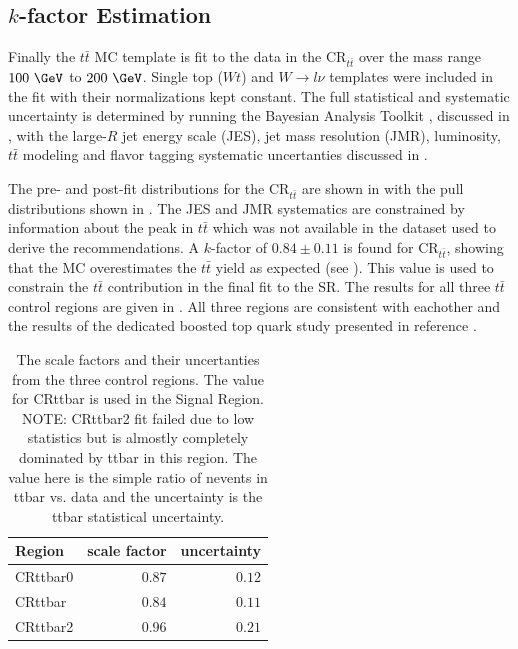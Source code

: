 \subsection{$k$-factor Estimation}

Finally the $t\bar{t}$ MC template is fit to the data in the
$\text{CR}_{t\bar{t}}$ over the mass range $100~\GeV$ to $200~\GeV$.  Single
top ($Wt$) and $W \rightarrow l\nu$ templates were included in the fit with
their normalizations kept constant. The full statistical and systematic
uncertainty is determined by running the Bayesian Analysis Toolkit
\cite{Beaujean:2011zz}, discussed in , with the large-$R$ jet
energy scale (JES), jet mass resolution (JMR), luminosity, $t\bar{t}$
modeling and flavor tagging systematic uncertanties discussed in
.

The pre- and post-fit distributions for the $\text{CR}_{t\bar{t}}$ are shown in
 with the pull distributions shown in
.  The JES and JMR systematics are constrained
by information about the peak in $t\bar{t}$ which was not available in the
dataset used to derive the recommendations. A $k$-factor of $0.84 \pm 0.11$ is
found for $\text{CR}_{t\bar{t}}$, showing that the MC overestimates the
$t\bar{t}$ yield as expected (see ). This
value is used to constrain the $t\bar{t}$ contribution in the final fit to the
SR. The results for all three $t\bar{t}$ control regions are given in
.  All three regions are consistent with eachother
and the results of the dedicated boosted top quark study presented in reference
\cite{ATLAS:2016jct}.

\begin{table}
  \centering
  \caption{The \ttbar scale factors and their uncertanties from the three \ttbar
control regions. The value for CRttbar is used in the Signal Region. NOTE:
CRttbar2 fit failed due to low statistics but is almostly completely dominated
by ttbar in this region.  The value here is the simple ratio of nevents in ttbar
vs. data and the uncertainty is the ttbar statistical uncertainty.}
  \begin{tabular}{@{}lrr@{}}
    \toprule
    Region & scale factor & uncertainty \\
    \midrule
    CRttbar0 & $0.87$ & $0.12$ \\
    CRttbar  & $0.84$ & $0.11$ \\
    CRttbar2 & $0.96$ & $0.21$ \\
    \bottomrule
  \end{tabular}
  \label{table:ttbar_kfactors}
\end{table}

